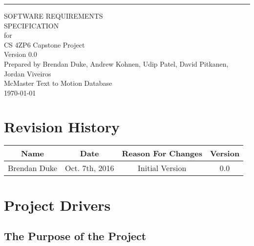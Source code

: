 \documentclass{scrreprt}
\date{}
\def\myversion{0.0 }
\begin{document}
\begin{flushright}
    \rule{16cm}{5pt}\vskip1cm
    \begin{bfseries}
        \Huge{SOFTWARE REQUIREMENTS\\ SPECIFICATION}\\
        \vspace{1.9cm}
        for\\
        \vspace{1.9cm}
        CS 4ZP6 Capstone Project\\
        \vspace{1.9cm}
        \LARGE{Version \myversion}\\
        \vspace{1.9cm}
        Prepared by Brendan Duke, Andrew Kohnen, Udip Patel, David Pitkanen, Jordan Viveiros\\
        \vspace{1.9cm}
        McMaster Text to Motion Database\\
        \vspace{1.9cm}
        \today\\
    \end{bfseries}
\end{flushright}

\tableofcontents

\chapter*{Revision History}

\begin{center}
    \begin{tabular}{|c|c|c|c|}
        \hline
	    Name & Date & Reason For Changes & Version\\
        \hline
	    Brendan Duke & Oct. 7th, 2016 & Initial Version & 0.0\\
        \hline
    \end{tabular}
\end{center}


\chapter{Project Drivers}

\section{The Purpose of the Project}
\end{document}
